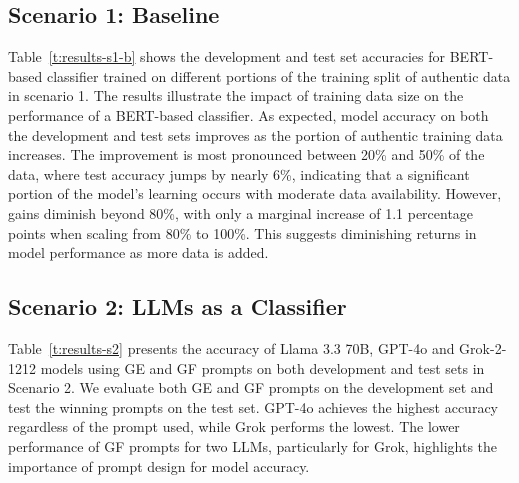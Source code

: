 \subsection{Scenario 1: Baseline}



Table~\ref{t:results-s1-b} shows the development and test set accuracies for BERT-based classifier trained on different portions of the training split of authentic data in scenario 1.
The results illustrate the impact of training data size on the performance of a BERT-based classifier.
As expected, model accuracy on both the development and test sets improves as the portion of authentic training data increases. The improvement is most pronounced between 20\% and 50\% of the data, where test accuracy jumps by nearly 6\%, indicating that a significant portion of the model's learning occurs with moderate data availability. However, gains diminish beyond 80\%, with only a marginal increase of 1.1 percentage points when scaling from 80\% to 100\%. This suggests diminishing returns in model performance as more data is added.%


\subsection{Scenario 2: LLMs as a Classifier}

Table~\ref{t:results-s2} presents the accuracy of Llama 3.3 70B, GPT-4o and Grok-2-1212 models using GE and GF prompts on both development and test sets in Scenario 2. We evaluate both GE and GF prompts on the development set and test the winning prompts on the test set.
GPT-4o achieves the highest accuracy regardless of the prompt used, %
while Grok performs the lowest.
The lower performance of GF prompts for two LLMs, particularly for Grok, highlights the importance of prompt design for model accuracy.

